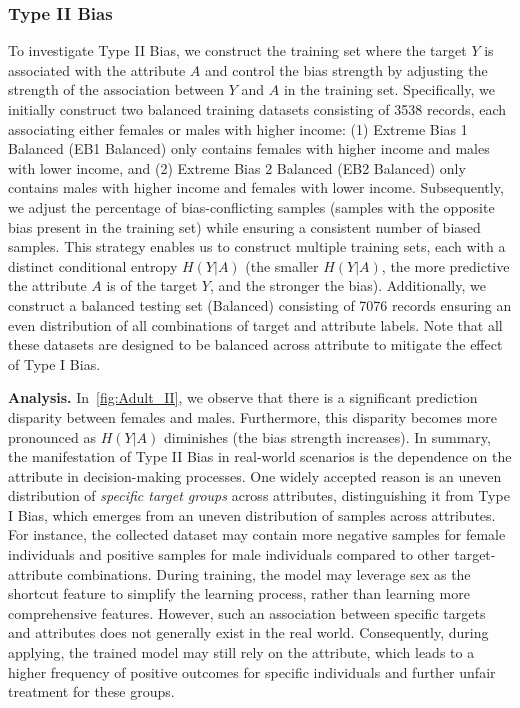 \subsubsection{Type II Bias}
To investigate Type II Bias, we construct the training set where the target $Y$ is associated with the attribute $A$ and control the bias strength by adjusting the strength of the association between $Y$ and $A$ in the training set.
Specifically, we initially construct two balanced training datasets consisting of 3538 records, each associating either females or males with higher income: (1) Extreme Bias 1 Balanced (EB1 Balanced) only contains females with higher income and males with lower income, and (2) Extreme Bias 2 Balanced (EB2 Balanced) only contains males with higher income and females with lower income.
Subsequently, we adjust the percentage of bias-conflicting samples (samples with the opposite bias present in the training set) while ensuring a consistent number of biased samples. 
This strategy enables us to construct multiple training sets, each with a distinct conditional entropy $H(Y|A)$ (\ie the smaller $H(Y|A)$, the more predictive the attribute $A$ is of the target $Y$, and the stronger the bias). 
Additionally, we construct a balanced testing set (Balanced) consisting of 7076 records ensuring an even distribution of all combinations of target and attribute labels.
Note that all these datasets are designed to be balanced across attribute to mitigate the effect of Type I Bias.

















\noindent
\textbf{Analysis.}
In~\cref{fig:Adult_II}, we observe that there is a significant prediction disparity between females and males.
Furthermore, this disparity becomes more pronounced as $H(Y|A)$ diminishes (the bias strength increases).
In summary, the manifestation of Type II Bias in real-world scenarios is the dependence on the attribute in decision-making processes.
One widely accepted reason is an uneven distribution of \emph{specific target groups} across attributes, distinguishing it from Type I Bias, which emerges from an uneven distribution of samples across attributes. 
For instance, the collected dataset may contain more negative samples for female individuals and positive samples for male individuals compared to other target-attribute combinations.
During training, the model may leverage sex as the shortcut feature to simplify the learning process, rather than learning more comprehensive features. 
However, such an association between specific targets and attributes does not generally exist in the real world. 
Consequently, during applying, the trained model may still rely on the attribute, which leads to a higher frequency of positive outcomes for specific individuals and further unfair treatment for these groups.









